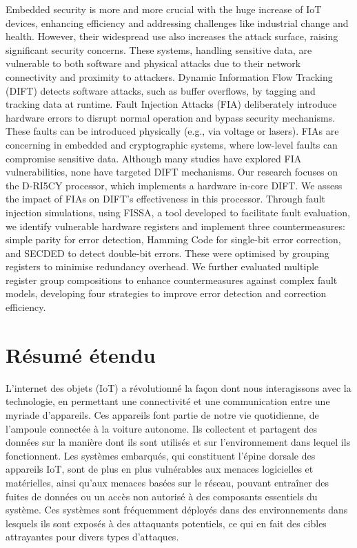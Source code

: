 Embedded security is more and more crucial with the huge increase of IoT devices, enhancing efficiency and addressing challenges like industrial change and health. However, their widespread use also increases the attack surface, raising significant security concerns. These systems, handling sensitive data, are vulnerable to both software and physical attacks due to their network connectivity and proximity to attackers.
Dynamic Information Flow Tracking (DIFT) detects software attacks, such as buffer overflows, by tagging and tracking data at runtime. Fault Injection Attacks (FIA) deliberately introduce hardware errors to disrupt normal operation and bypass security mechanisms. These faults can be introduced physically (e.g., via voltage or lasers). FIAs are concerning in embedded and cryptographic systems, where low-level faults can compromise sensitive data. Although many studies have explored FIA vulnerabilities, none have targeted DIFT mechanisms.
Our research focuses on the D-RI5CY processor, which implements a hardware in-core DIFT. We assess the impact of FIAs on DIFT's effectiveness in this processor. Through fault injection simulations, using FISSA, a tool developed to facilitate fault evaluation, we identify vulnerable hardware registers and implement three countermeasures: simple parity for error detection, Hamming Code for single-bit error correction, and SECDED to detect double-bit errors. These were optimised by grouping registers to minimise redundancy overhead. We further evaluated multiple register group compositions to enhance countermeasures against complex fault models, developing four strategies to improve error detection and correction efficiency.


\chapter*{Résumé étendu}
\label{chapter:extended_resume}

L'internet des objets (IoT) a révolutionné la façon dont nous interagissons avec la technologie, en permettant une connectivité et une communication entre une myriade d'appareils. Ces appareils font partie de notre vie quotidienne, de l'ampoule connectée à la voiture autonome. Ils collectent et partagent des données sur la manière dont ils sont utilisés et sur l'environnement dans lequel ils fonctionnent. Les systèmes embarqués, qui constituent l'épine dorsale des appareils IoT, sont de plus en plus vulnérables aux menaces logicielles et matérielles, ainsi qu'aux menaces basées sur le réseau, pouvant entraîner des fuites de données ou un accès non autorisé à des composants essentiels du système. Ces systèmes sont fréquemment déployés dans des environnements dans lesquels ils sont exposés à des attaquants potentiels, ce qui en fait des cibles attrayantes pour divers types d'attaques.

